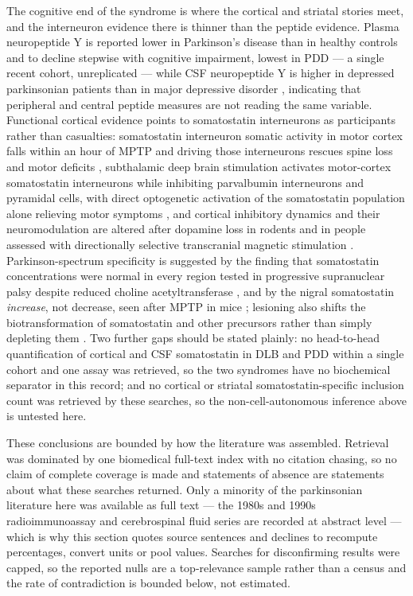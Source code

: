 \documentclass[11pt]{article}
\begin{document}
The cognitive end of the syndrome is where the cortical and striatal stories meet, and the interneuron evidence there is thinner than the peptide evidence. Plasma neuropeptide Y is reported lower in Parkinson's disease than in healthy controls and to decline stepwise with cognitive impairment, lowest in PDD \citep{Zhang2026b} --- a single recent cohort, unreplicated --- while CSF neuropeptide Y is higher in depressed parkinsonian patients than in major depressive disorder \citep{Svenningsson2017}, indicating that peripheral and central peptide measures are not reading the same variable. Functional cortical evidence points to somatostatin interneurons as participants rather than casualties: somatostatin interneuron somatic activity in motor cortex falls within an hour of MPTP and driving those interneurons rescues spine loss and motor deficits \citep{Chen2019}, subthalamic deep brain stimulation activates motor-cortex somatostatin interneurons while inhibiting parvalbumin interneurons and pyramidal cells, with direct optogenetic activation of the somatostatin population alone relieving motor symptoms \citep{Valverde2020}, and cortical inhibitory dynamics and their neuromodulation are altered after dopamine loss in rodents \citep{Minetti2025,Gui2010} and in people assessed with directionally selective transcranial magnetic stimulation \citep{OFarrell2026}. Parkinson-spectrum specificity is suggested by the finding that somatostatin concentrations were normal in every region tested in progressive supranuclear palsy despite reduced choline acetyltransferase \citep{Epelbaum1987}, and by the nigral somatostatin \emph{increase}, not decrease, seen after MPTP in mice \citep{Radke1987}; lesioning also shifts the biotransformation of somatostatin and other precursors rather than simply depleting them \citep{Nilsson2009}. Two further gaps should be stated plainly: no head-to-head quantification of cortical and CSF somatostatin in DLB and PDD within a single cohort and one assay was retrieved, so the two syndromes have no biochemical separator in this record; and no cortical or striatal somatostatin-specific inclusion count was retrieved by these searches, so the non-cell-autonomous inference above is untested here.

These conclusions are bounded by how the literature was assembled. Retrieval was dominated by one biomedical full-text index with no citation chasing, so no claim of complete coverage is made and statements of absence are statements about what these searches returned. Only a minority of the parkinsonian literature here was available as full text --- the 1980s and 1990s radioimmunoassay and cerebrospinal fluid series are recorded at abstract level --- which is why this section quotes source sentences and declines to recompute percentages, convert units or pool values. Searches for disconfirming results were capped, so the reported nulls are a top-relevance sample rather than a census and the rate of contradiction is bounded below, not estimated.
\end{document}
